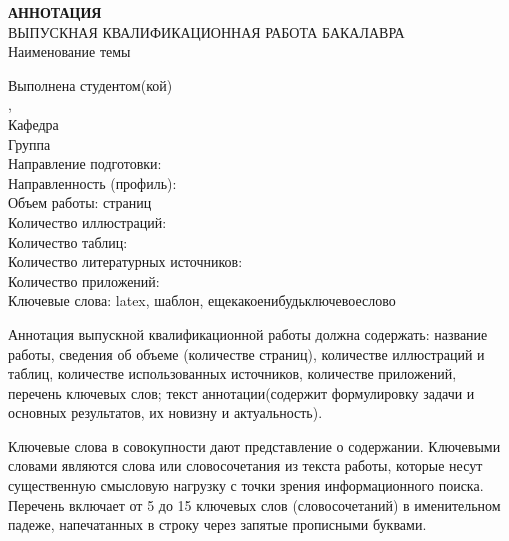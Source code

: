 \newpage
\thispagestyle{empty}

\begin{par}
\setlength{\baselineskip}{5mm}

\begin{center}
	\textbf{АННОТАЦИЯ} \\
	\vspace{5mm}
	ВЫПУСКНАЯ КВАЛИФИКАЦИОННАЯ РАБОТА БАКАЛАВРА \\
	Наименование темы \uline{\topic\hfill} \\
	\hrulefill
\end{center}

\begin{flushleft}
	Выполнена студентом(кой) \uline{\studentforabstract\hfill} \\
	\faculty, \university \\
	Кафедра \uline{\department\hfill} \\
	Группа \uline{\group} \\
	Направление подготовки: \programnum\thinspace\programname \\
	Направленность (профиль): \specialization \\
    \vspace{5mm}
	Объем работы:  страниц \\
	Количество иллюстраций: \totalfigures \\
	Количество таблиц: \totaltables \\
	Количество литературных источников:  \\
	Количество приложений:  \\
	Ключевые слова: latex, шаблон, ещекакоенибудьключевоеслово
\end{flushleft}

Аннотация выпускной квалификационной работы должна содержать: название работы, сведения об объеме (количестве страниц), количестве иллюстраций и таблиц, количестве использованных источников, количестве приложений, перечень ключевых слов; текст аннотации(содержит формулировку задачи и основных результатов, их новизну и актуальность). 

Ключевые слова в совокупности дают представление о содержании. Ключевыми словами являются слова или словосочетания из текста работы, которые несут существенную смысловую нагрузку с точки зрения информационного поиска. Перечень включает от 5 до 15 ключевых слов (словосочетаний) в именительном падеже, напечатанных в строку через запятые прописными буквами. 


\end{par}
